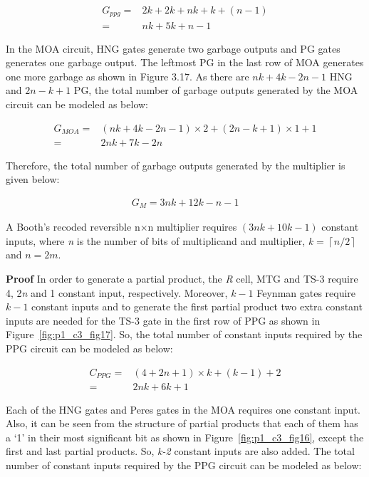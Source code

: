 \begin{align*}
	G_{ppg}=&2k + 2k + nk + k + (n-1)\\
	=& nk + 5k + n - 1
\end{align*}

\noindent In the MOA circuit, HNG gates generate two garbage outputs and PG gates generates one garbage output. The leftmost PG in the last row of MOA generates one more garbage as shown in Figure 3.17. As there are $nk+4k-2n-1$ HNG and $2n-k+1$ PG, the total number of garbage outputs generated by the MOA circuit can be modeled as below: 

\begin{align*}
	G_{MOA}=& (nk + 4k  - 2n - 1)\times 2+(2n - k + 1) \times 1+1\\	
=& 2nk + 7k - 2n 
\end{align*}

\noindent Therefore, the total number of garbage outputs generated by the multiplier is given below:

\begin{align*}
G_{M}= 3nk + 12k - n - 1
\end{align*}

\begin{property}\textnormal{
	A Booth's recoded reversible {n$\times $n }multiplier requires $(3nk + 10k - 1)$ constant inputs, where \textit{n} is the number of bits of multiplicand and multiplier, \textit{k} = $\left\lceil n/2\right\rceil $ and $n=2m$.}
\end{property}

\noindent\textbf{Proof}
	In order to generate a partial product, the \textit{R} cell, MTG and TS-3 require 4, 2\textit{n} and 1 constant input, respectively. Moreover, $k-1$ Feynman gates require $k-1$ constant inputs and to  generate  the  first  partial  product two extra constant inputs are needed for the TS-3  gate in the first row of PPG as shown in Figure~\ref{fig:p1_c3_fig17}. So, the total number of constant inputs required by the PPG circuit can be modeled as below: 

\begin{align*}
C_{PPG} =& (4+2n+1) \times  k + (k-1) + 2\\
=& 2 nk + 6k + 1
\end{align*}


\noindent Each of the HNG gates and Peres gates in the MOA requires one constant input. Also, it can be seen from the structure of partial products that each of them has a `1' in their most significant bit as shown in Figure~\ref{fig:p1_c3_fig16}, except the first and last partial products. So, \textit{k-2 }constant inputs are also added. The total number of constant inputs required by the PPG circuit can be modeled as below:


